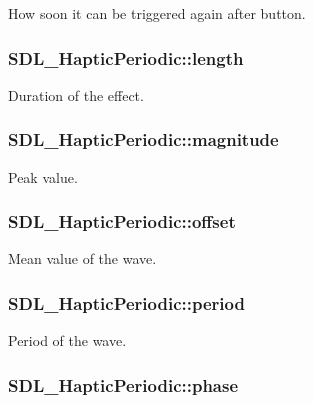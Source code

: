 How soon it can be triggered again after button. \hypertarget{struct_s_d_l___haptic_periodic_a0ef0b17c54aaa5c99886c2a618444026}{
\subsubsection[{length}]{ S\-D\-L\-\_\-\-Haptic\-Periodic\-::length}}\label{struct_s_d_l___haptic_periodic_a0ef0b17c54aaa5c99886c2a618444026}
Duration of the effect. \hypertarget{struct_s_d_l___haptic_periodic_aad0ad2b00c7e6959da627663d91f7b94}{
\subsubsection[{magnitude}]{ S\-D\-L\-\_\-\-Haptic\-Periodic\-::magnitude}}\label{struct_s_d_l___haptic_periodic_aad0ad2b00c7e6959da627663d91f7b94}
Peak value. \hypertarget{struct_s_d_l___haptic_periodic_abc7aa9e9c0d546cb54189a7812fbe554}{
\subsubsection[{offset}]{ S\-D\-L\-\_\-\-Haptic\-Periodic\-::offset}}\label{struct_s_d_l___haptic_periodic_abc7aa9e9c0d546cb54189a7812fbe554}
Mean value of the wave. \hypertarget{struct_s_d_l___haptic_periodic_a0e7e105b96308129b248d52b56a2a839}{
\subsubsection[{period}]{ S\-D\-L\-\_\-\-Haptic\-Periodic\-::period}}\label{struct_s_d_l___haptic_periodic_a0e7e105b96308129b248d52b56a2a839}
Period of the wave. \hypertarget{struct_s_d_l___haptic_periodic_a25e8c6aebc78bd74b9343fa228d25d8f}{
\subsubsection[{phase}]{ S\-D\-L\-\_\-\-Haptic\-Periodic\-::phase}}\label{struct_s_d_l___haptic_periodic_a25e8c6aebc78bd74b9343fa228d25d8f}
